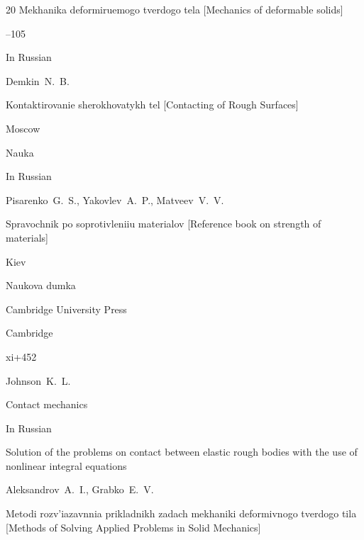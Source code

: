 \begin{thebibliography}{20}
\inbook Mekhanika deformiruemogo tverdogo tela \rm [Mechanics of deformable solids]


--105




\lang In Russian

\by Demkin~N.~B.

\book Kontaktirovanie sherokhovatykh tel \rm [Contacting of Rough Surfaces]

\publaddr  Moscow

\publ Nauka






\lang In Russian

\by Pisarenko~G.~S., Yakovlev~A.~P., Matveev~V.~V.

\book Spravochnik po soprotivleniiu materialov \rm [Reference book on strength of materials]

\publaddr  Kiev

\publ Naukova dumka









\publ Cambridge University Press

\publaddr Cambridge

\totalpages  xi+452

\by Johnson~K.~L.

\book Contact mechanics







\lang In Russian

\paper Solution of the problems on contact between elastic rough bodies with the use of nonlinear integral equations

\by Aleksandrov~A.~I., Grabko~E.~V.

\inbook Metodi rozv'iazavnnia prikladnikh zadach mekhaniki deformivnogo tverdogo tila \rm [Methods of Solving Applied Problems in Solid Mechanics]


\end{thebibliography}
